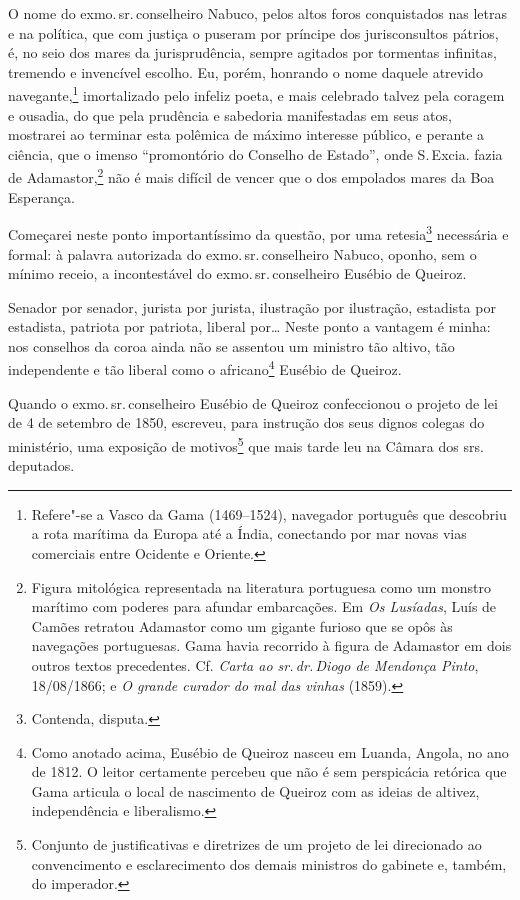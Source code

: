 O nome do exmo.\,sr.\,conselheiro Nabuco, pelos altos foros conquistados
nas letras e na política, que com justiça o puseram por príncipe dos
jurisconsultos pátrios, é, no seio dos mares da jurisprudência, sempre
agitados por tormentas infinitas, tremendo e invencível escolho. Eu,
porém, honrando o nome daquele atrevido navegante,\footnote{Refere"-se a
  Vasco da Gama (1469--1524), navegador português que descobriu a rota
  marítima da Europa até a Índia, conectando por mar novas vias
  comerciais entre Ocidente e Oriente.} imortalizado pelo infeliz
poeta, e mais celebrado talvez pela coragem e ousadia, do que pela
prudência e sabedoria manifestadas em seus atos, mostrarei ao terminar
esta polêmica de máximo interesse público, e perante a ciência, que o
imenso ``promontório do Conselho de Estado'', onde S.\,Excia. fazia de
Adamastor,\footnote{Figura mitológica representada na literatura
  portuguesa como um monstro marítimo com poderes para afundar
  embarcações. Em \emph{Os Lusíadas}, Luís de Camões retratou Adamastor
  como um gigante furioso que se opôs às navegações portuguesas. Gama
  havia recorrido à figura de Adamastor em dois outros textos
  precedentes. Cf. \emph{Carta ao sr.\,dr.\,Diogo de Mendonça Pinto},
  18/08/1866; e \emph{O grande curador do mal das vinhas} (1859).} não
é mais difícil de vencer que o dos empolados mares da Boa Esperança.

Começarei neste ponto importantíssimo da questão, por uma
retesia\footnote{Contenda, disputa.} necessária e formal: à palavra
autorizada do exmo.\,sr.\,conselheiro Nabuco, oponho, sem o mínimo receio,
a incontestável do exmo.\,sr.\,conselheiro Eusébio de Queiroz.

Senador por senador, jurista por jurista, ilustração por ilustração,
estadista por estadista, patriota por patriota, liberal por\ldots{} Neste
ponto a vantagem é minha: nos conselhos da coroa ainda não se assentou
um ministro tão altivo, tão independente e tão liberal como o
africano\footnote{Como anotado acima, Eusébio de Queiroz nasceu em
  Luanda, Angola, no ano de 1812. O leitor certamente percebeu que não é
  sem perspicácia retórica que Gama articula o local de nascimento de
  Queiroz com as ideias de altivez, independência e liberalismo.}
Eusébio de Queiroz.

Quando o exmo.\,sr.\,conselheiro Eusébio de Queiroz confeccionou o projeto
de lei de 4 de setembro de 1850, escreveu, para instrução dos seus
dignos colegas do ministério, uma exposição de motivos\footnote{
  Conjunto de justificativas e diretrizes de um projeto de lei
  direcionado ao convencimento e esclarecimento dos demais ministros do
  gabinete e, também, do imperador.} que mais tarde leu na Câmara dos
srs.\,deputados.

